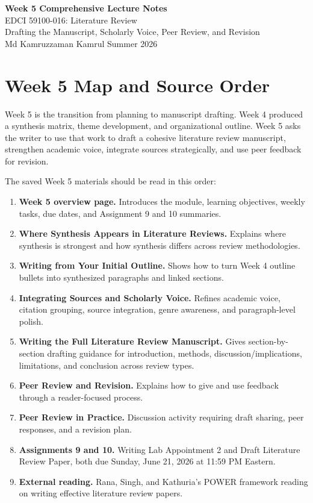 \documentclass[10pt,letterpaper]{article}
\begin{document}
\begin{center}
{\Large\bfseries Week 5 Comprehensive Lecture Notes}\\[0.25em]
{\normalsize EDCI 59100-016: Literature Review}\\
{\normalsize Drafting the Manuscript, Scholarly Voice, Peer Review, and Revision}\\[0.25em]
{\normalsize Md Kamruzzaman Kamrul \textbar{} Summer 2026}
\end{center}

\tableofcontents
\newpage

\section{Week 5 Map and Source Order}

Week 5 is the transition from planning to manuscript drafting. Week 4 produced a synthesis matrix, theme development, and organizational outline. Week 5 asks the writer to use that work to draft a cohesive literature review manuscript, strengthen academic voice, integrate sources strategically, and use peer feedback for revision.

The saved Week 5 materials should be read in this order:

\begin{enumerate}
\item \textbf{Week 5 overview page.} Introduces the module, learning objectives, weekly tasks, due dates, and Assignment 9 and 10 summaries.
\item \textbf{Where Synthesis Appears in Literature Reviews.} Explains where synthesis is strongest and how synthesis differs across review methodologies.
\item \textbf{Writing from Your Initial Outline.} Shows how to turn Week 4 outline bullets into synthesized paragraphs and linked sections.
\item \textbf{Integrating Sources and Scholarly Voice.} Refines academic voice, citation grouping, source integration, genre awareness, and paragraph-level polish.
\item \textbf{Writing the Full Literature Review Manuscript.} Gives section-by-section drafting guidance for introduction, methods, discussion/implications, limitations, and conclusion across review types.
\item \textbf{Peer Review and Revision.} Explains how to give and use feedback through a reader-focused process.
\item \textbf{Peer Review in Practice.} Discussion activity requiring draft sharing, peer responses, and a revision plan.
\item \textbf{Assignments 9 and 10.} Writing Lab Appointment 2 and Draft Literature Review Paper, both due Sunday, June 21, 2026 at 11:59 PM Eastern.
\item \textbf{External reading.} Rana, Singh, and Kathuria's POWER framework reading on writing effective literature review papers.
\end{enumerate}
\end{document}
